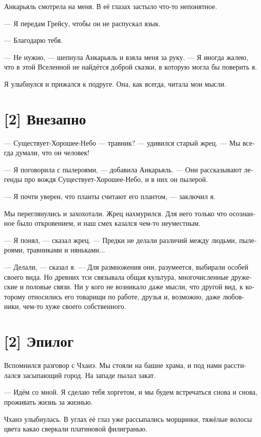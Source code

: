 \documentclass[a4paper,12pt,fleqn]{book}\usepackage{cooltooltips}\usepackage{polyglossia}\setdefaultlanguage[babelshorthands=true]{russian}\setotherlanguage{english}\defaultfontfeatures{Ligatures=TeX,Mapping=tex-text} \usepackage{xcolor}\definecolor{lightgray}{HTML}{bbbbbb}\color{lightgray}\newcommand{\ml}[3]{\textenglish{\textcolor{black}{#3}}}
\begin{document}
{Анкарьяль смотрела на меня.
В её глазах застыло что-то непонятное.

--- Я передам Грейсу, чтобы он не распускал язык.

--- Благодарю тебя.

--- Не нужно, --- шепнула Анкарьяль и взяла меня за руку.
--- Я иногда жалею, что в этой Вселенной не найдётся доброй сказки, в которую могла бы поверить я.

Я улыбнулся и прижался к подруге.
Она, как всегда, читала мои мысли.

\section{[2] Внезапно}

--- Существует-Хорошее-Небо — травник? --- удивился старый жрец.
--- Мы всегда думали, что он человек!

--- Я поговорила с пылероями, --- добавила Анкарьяль.
--- Они рассказывают легенды про вождя Существует-Хорошее-Небо, и в них он пылерой.

--- Я почти уверен, что планты считают его плантом, --- заключил я.

Мы переглянулись и захохотали.
Жрец нахмурился.
Для него только что осознанное было откровением, и наш смех казался чем-то неуместным.

--- Я понял, --- сказал жрец.
--- Предки не делали различий между людьми, пылероями, травниками и няньками...

--- Делали, --- сказал я.
--- Для размножения они, разумеется, выбирали особей своего вида.
Но древних тси связывала общая культура, многочисленные дружеские и половые связи.
Ни у кого не возникало даже мысли, что другой вид, к которому относились его товарищи по работе, друзья и, возможно, даже любовники, чем-то хуже своего собственного.

\section{[2] Эпилог}

Вспомнился разговор с Чханэ.
Мы стояли на башне храма, и под нами расстилался засыпающий город.
На западе пылал закат.

--- Идём со мной.
Я сделаю тебя хоргетом, и мы будем встречаться снова и снова, проживать жизнь за жизнью.

Чханэ улыбнулась.
В углах её глаз уже рассыпались морщинки, тяжёлые волосы цвета какао сверкали платиновой филигранью.

}
\end{document}

